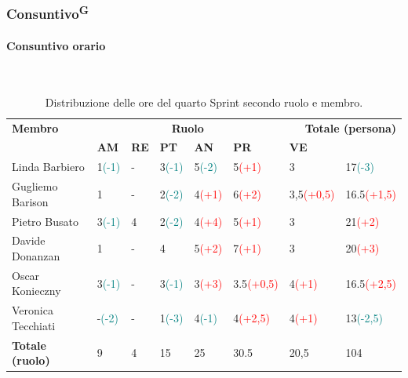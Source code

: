 \documentclass[8pt]{article}
\newcommand{\glossterm}[1]{#1\textsuperscript{G}} %
\newcommand{\subsubsubsection}[1]{\paragraph{#1}\mbox{}\\}
\begin{document}
\subsubsection{\glossterm{Consuntivo}}
\subsubsubsection{Consuntivo orario}
\begin{table}[ht!]
	\centering
	\begin{tabular}{p{3cm} p{1.4cm} p{1.6cm} p{1.7cm} p{1.4cm} p{1.4cm} p{1.5cm} p{2cm}}
		\toprule
        \textbf{Membro} & \multicolumn{5}{c}{\textbf{Ruolo}} & \multicolumn{2}{r}{\textbf{Totale (persona)}}\\
		& \textbf{AM} & \textbf{RE} & \textbf{PT} & \textbf{AN} & \textbf{PR} & \textbf{VE}\\
		\midrule
        Linda Barbiero     & 1\textcolor{teal}{(-1)} & - & 3\textcolor{teal}{(-1)} & 5\textcolor{teal}{(-2)} & 5\textcolor{red}{(+1)} & 3 & 17\textcolor{teal}{(-3)} \\
        Gugliemo Barison   & 1 & - & 2\textcolor{teal}{(-2)} & 4\textcolor{red}{(+1)} & 6\textcolor{red}{(+2)} & 3,5\textcolor{red}{(+0,5)} & 16.5\textcolor{red}{(+1,5)} \\
        Pietro Busato      & 3\textcolor{teal}{(-1)} & 4 & 2\textcolor{teal}{(-2)} & 4\textcolor{red}{(+4)} & 5\textcolor{red}{(+1)} & 3 & 21\textcolor{red}{(+2)} \\
        Davide Donanzan    & 1 & - & 4 & 5\textcolor{red}{(+2)} & 7\textcolor{red}{(+1)} & 3 & 20\textcolor{red}{(+3)} \\
        Oscar Konieczny    & 3\textcolor{teal}{(-1)} & - & 3\textcolor{teal}{(-1)} & 3\textcolor{red}{(+3)} & 3.5\textcolor{red}{(+0,5)} & 4\textcolor{red}{(+1)} & 16.5\textcolor{red}{(+2,5)}\\
        Veronica Tecchiati & -\textcolor{teal}{(-2)} & - & 1\textcolor{teal}{(-3)} & 4\textcolor{teal}{(-1)} & 4\textcolor{red}{(+2,5)} & 4\textcolor{red}{(+1)} & 13\textcolor{teal}{(-2,5)} \\
        \midrule
        \textbf{Totale (ruolo)} & 9 & 4 & 15 & 25 & 30.5 & 20,5 & 104 \\
		\bottomrule
	\end{tabular}
	\caption{Distribuzione delle ore del quarto Sprint secondo ruolo e membro.}
	\label{table:Distribuzione delle ore del terzo Sprint secondo ruolo e membr}
\end{table}
\end{document}
